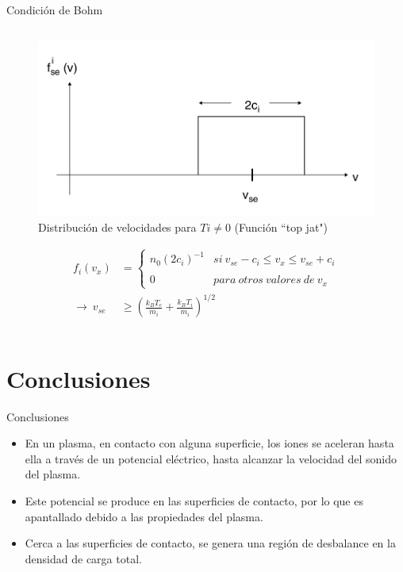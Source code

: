 \documentclass[11pt]{beamer}
\begin{document}
\begin{frame}[t]{Condici\'on de Bohm}
\begin{columns}
   \begin{column}{0.4\textwidth}
   \begin{figure}
       \centering
       \includegraphics[width=\textwidth]{square.png}
       \caption{Distribuci\'on de velocidades para $Ti\neq0$ (Funci\'on  ``top jat")}
       \label{fig:my_label}
   \end{figure}
   \begin{align*}
        f_i\left(v_x\right) &= \left\{ \begin{array}{lcc}
             n_0\left(2c_i\right)^{-1} & si \ v_{se}-c_i \leq v_x \leq v_{se}+c_i \\
             \\ 0 &  para \ otros \ valores \ de \ v_x
             \end{array}
   \right. \\
   \rightarrow \ v_{se} &\geq \left(\frac{k_BT_e}{m_i} + \frac{k_BT_i}{m_i}\right)^{1/2}
        \end{align*}
   \end{column}
   \end{columns}
   \end{frame}
   
   \section{Conclusiones}
        \begin{frame}{Conclusiones}
            \begin{itemize}
                \item En un plasma, en contacto con alguna superficie, los iones se aceleran hasta ella a través de un potencial eléctrico, hasta alcanzar la velocidad del sonido del plasma. 
                \item Este potencial se produce en las superficies de contacto, por lo que es apantallado debido a las propiedades del plasma. 
                \item Cerca a las superficies de contacto, se genera una región de desbalance en la densidad de carga total.
            \end{itemize}
        \end{frame}


\end{document}
